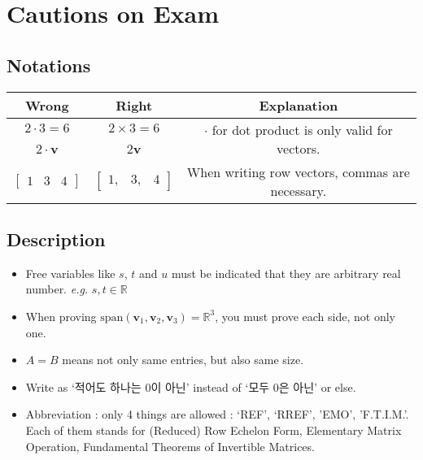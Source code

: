 \chapter{Cautions on Exam}
\section{Notations}
\begin{table}[h]
	\centering
	\begin{tabular}{|c|c|c|}
		\hline
		Wrong & Right & Explanation \\
		\hline
		$ 2 \cdot 3 = 6 $ & $ 2 \times 3 = 6 $ & \multirow{2}{*}{$ \cdot $ for dot product is only valid for vectors.} \\
		\cline{1-2}
		$ 2 \cdot \textbf{v}$ & $2\textbf{v} $ & \\
		\hline
		$\begin{bmatrix} 1 & 3 & 4 \end{bmatrix}$ & $\begin{bmatrix} 1, & 3, & 4 \end{bmatrix}$ & When writing row vectors, commas are necessary. \\
		\hline
		
	\end{tabular}
\end{table}
\section{Description}
\begin{itemize}
\item Free variables like $s$, $t$ and $u$ must be indicated that they are arbitrary real number. \textit{e.g.} $ s,t \in \mathbb{R} $
\item When proving $ \text{span}\left(\textbf{v}_1,\textbf{v}_2,\textbf{v}_3\right) = \mathbb{R}^{3} $, you must prove each side, not only one.
\item $ A=B $ means not only same entries, but also same size.
\item Write as `적어도 하나는 0이 아닌' instead of `모두 0은 아닌' or else.
\item Abbreviation : only 4 things are allowed : `REF', `RREF', 'EMO', 'F.T.I.M.'. Each of them stands for (Reduced) Row Echelon Form, Elementary Matrix Operation, Fundamental Theorems of Invertible Matrices.
\end{itemize}